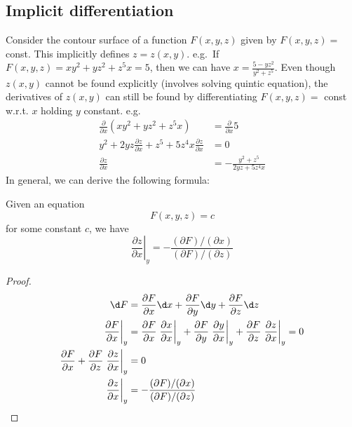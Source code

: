 \documentclass[a4paper]{article}
\begin{document}
\subsection{Implicit differentiation}
Consider the contour surface of a function $F(x, y, z)$ given by $F(x, y, z) = $ const. This implicitly defines $z = z(x, y)$. e.g.\ If $F(x, y, z) = xy^2 + yz^2 + z^5x = 5$, then we can have $x = \frac{5 - yz^2}{y^2 + z^5}$. Even though $z(x, y)$ cannot be found explicitly (involves solving quintic equation), the derivatives of $z(x, y)$ can still be found by differentiating $F(x, y, z) =$ const w.r.t. $x$ holding $y$ constant. e.g.
\begin{align*}
  \frac{\partial }{\partial x}(xy^2 + yz^2 + z^5x) &= \frac{\partial }{\partial x}5\\
  y^2 + 2yz\frac{\partial z}{\partial x} + z^5 + 5z^4x\frac{\partial z}{\partial x} &= 0\\
  \frac{\partial z}{\partial x} &= -\frac{y^2 + z^5}{2yz + 5z^4x}
\end{align*}
In general, we can derive the following formula:
\begin{thm} Given an equation
  \[
    F(x, y, z) = c
  \]
  for some constant $c$, we have
  \[
    \left.\frac{\partial z}{\partial x}\right|_y = -\frac{(\partial F)/(\partial x)}{(\partial F)/(\partial z)}
  \]
\end{thm}

\begin{proof}
  \begin{align*}
    \d F &= \frac{\partial F}{\partial x}\d x + \frac{\partial F}{\partial y}\d y + \frac{\partial F}{\partial z}\d z\\
    \left.\frac{\partial F}{\partial x}\right|_y &= \frac{\partial F}{\partial x}\left.\frac{\partial x}{\partial x}\right|_y + \frac{\partial F}{\partial y}\left.\frac{\partial y}{\partial x}\right|_y + \frac{\partial F}{\partial z}\left.\frac{\partial z}{\partial x}\right|_y = 0\\
    \frac{\partial F}{\partial x} + \frac{\partial F}{\partial z}\left.\frac{\partial z}{\partial x}\right|_y &= 0\\
    \left.\frac{\partial z}{\partial x}\right|_y &= -\frac{(\partial F)/(\partial x)}{(\partial F)/(\partial z)}\qedhere
  \end{align*}
\end{proof}
\end{document}
